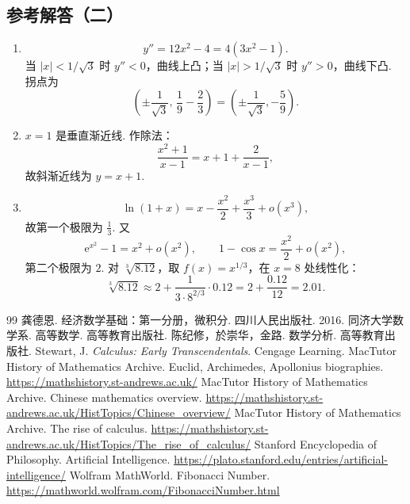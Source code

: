 \documentclass[fontset=fandol]{ctexart}
\newcommand{\ee}{\mathrm{e}}
\begin{document}
\subsection{参考解答（二）}
\begin{enumerate}[label=\textbf{练习\arabic*.},leftmargin=2.2em]
\item
\[
y''=12x^2-4=4(3x^2-1).
\]
当 $|x|<1/\sqrt3$ 时 $y''<0$，曲线上凸；当 $|x|>1/\sqrt3$ 时 $y''>0$，曲线下凸. 拐点为
\[
\left(\pm\frac1{\sqrt3},\,\frac19-\frac23\right)=\left(\pm\frac1{\sqrt3},-\frac59\right).
\]
\item $x=1$ 是垂直渐近线. 作除法：
\[
\frac{x^2+1}{x-1}=x+1+\frac2{x-1},
\]
故斜渐近线为 $y=x+1$.
\item
\[
\ln(1+x)=x-\frac{x^2}{2}+\frac{x^3}{3}+o(x^3),
\]
故第一个极限为 $\frac13$. 又
\[
\ee^{x^2}-1=x^2+o(x^2),\qquad 1-\cos x=\frac{x^2}{2}+o(x^2),
\]
第二个极限为 $2$. 对 $\sqrt[3]{8.12}$，取 $f(x)=x^{1/3}$，在 $x=8$ 处线性化：
\[
\sqrt[3]{8.12}\approx2+\frac{1}{3\cdot 8^{2/3}}\cdot0.12=2+\frac{0.12}{12}=2.01.
\]
\end{enumerate}

\clearpage
\renewcommand{\refname}{References}
\begin{thebibliography}{99}
 龚德恩. 经济数学基础：第一分册，微积分. 四川人民出版社. 2016.
 同济大学数学系. 高等数学. 高等教育出版社.
 陈纪修，於崇华，金路. 数学分析. 高等教育出版社.
 Stewart, J. \emph{Calculus: Early Transcendentals}. Cengage Learning.
 MacTutor History of Mathematics Archive. Euclid, Archimedes, Apollonius biographies. \url{https://mathshistory.st-andrews.ac.uk/}
 MacTutor History of Mathematics Archive. Chinese mathematics overview. \url{https://mathshistory.st-andrews.ac.uk/HistTopics/Chinese_overview/}
 MacTutor History of Mathematics Archive. The rise of calculus. \url{https://mathshistory.st-andrews.ac.uk/HistTopics/The_rise_of_calculus/}
 Stanford Encyclopedia of Philosophy. Artificial Intelligence. \url{https://plato.stanford.edu/entries/artificial-intelligence/}
 Wolfram MathWorld. Fibonacci Number. \url{https://mathworld.wolfram.com/FibonacciNumber.html}
\end{thebibliography}
\end{document}
